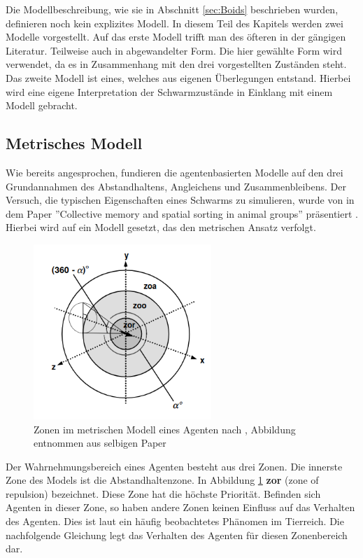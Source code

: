 Die Modellbeschreibung, wie sie in Abschnitt \ref{sec:Boids} beschrieben wurden, definieren noch kein explizites Modell.
In diesem Teil des Kapitels werden zwei Modelle vorgestellt. Auf das erste Modell trifft man des öfteren in der gängigen Literatur. Teilweise auch in abgewandelter Form. Die hier gewählte Form wird verwendet, da es in Zusammenhang mit den drei vorgestellten Zuständen steht. Das zweite Modell ist eines, welches aus eigenen Überlegungen entstand. Hierbei wird eine eigene Interpretation der Schwarmzustände in Einklang mit einem Modell gebracht.

\subsection{Metrisches Modell}\label{sec:metrischesModell}
Wie bereits angesprochen, fundieren die agentenbasierten Modelle auf den drei Grundannahmen des Abstandhaltens, Angleichens und Zusammenbleibens. Der Versuch, die typischen Eigenschaften eines Schwarms zu simulieren, wurde von in dem Paper ''Collective memory and spatial sorting in animal groups'' präsentiert \cite{Couzin2002CollectiveMA}.
Hierbei wird auf ein Modell gesetzt, das den metrischen Ansatz verfolgt.

\begin{figure}[H]
\centering

\includegraphics[width=0.6\textwidth]{figures/Forschung/metrisch.png} 

\caption{Zonen im metrischen Modell eines Agenten nach \cite{Couzin2002CollectiveMA}, Abbildung entnommen aus selbigen Paper \label{fig:Metrisch_couzin}}
\end{figure}

Der Wahrnehmungsbereich eines Agenten besteht aus drei Zonen. Die innerste Zone des Models ist die Abstandhaltenzone. In Abbildung \ref{fig:Metrisch_couzin} \textbf{zor} (zone of repulsion) bezeichnet. Diese Zone hat die höchste Priorität. Befinden sich Agenten in dieser Zone, so haben andere Zonen keinen Einfluss auf das Verhalten des Agenten. Dies ist laut \citet{inbook} ein häufig beobachtetes Phänomen im Tierreich. Die nachfolgende Gleichung legt das Verhalten des Agenten für diesen Zonenbereich dar.

